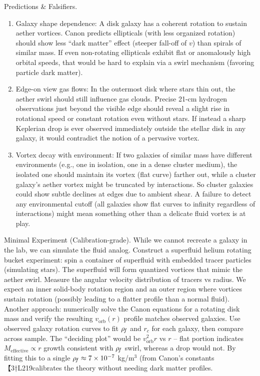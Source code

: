 \documentclass[11pt]{article}
\begin{document}
Predictions & Falsifiers.


\begin{enumerate}

\item 
Galaxy shape dependence: A disk galaxy has a coherent rotation to sustain aether vortices. Canon predicts ellipticals (with less organized rotation) should show less “dark matter” effect (steeper fall-off of $v$) than spirals of similar mass. If even non-rotating ellipticals exhibit flat or anomalously high orbital speeds, that would be hard to explain via a swirl mechanism (favoring particle dark matter).




\item 
Edge-on view gas flows: In the outermost disk where stars thin out, the aether swirl should still influence gas clouds. Precise 21-cm hydrogen observations just beyond the visible edge should reveal a slight rise in rotational speed or constant rotation even without stars. If instead a sharp Keplerian drop is ever observed immediately outside the stellar disk in any galaxy, it would contradict the notion of a pervasive vortex.




\item 
Vortex decay with environment: If two galaxies of similar mass have different environments (e.g., one in isolation, one in a dense cluster medium), the isolated one should maintain its vortex (flat curve) farther out, while a cluster galaxy’s aether vortex might be truncated by interactions. So cluster galaxies could show subtle declines at edges due to ambient shear. A failure to detect any environmental cutoff (all galaxies show flat curves to infinity regardless of interactions) might mean something other than a delicate fluid vortex is at play.




\end{enumerate}

Minimal Experiment (Calibration-grade). While we cannot recreate a galaxy in the lab, we can simulate the fluid analog. Construct a superfluid helium rotating bucket experiment: spin a container of superfluid with embedded tracer particles (simulating stars). The superfluid will form quantized vortices that mimic the aether swirl. Measure the angular velocity distribution of tracers vs radius. We expect an inner solid-body rotation region and an outer region where vortices sustain rotation (possibly leading to a flatter profile than a normal fluid). Another approach: numerically solve the Canon equations for a rotating disk mass and verify the resulting $v_{\text{orb}}(r)$ profile matches observed galaxies. Use observed galaxy rotation curves to fit $\rho_{\!f}$ and $r_c$ for each galaxy, then compare across sample. The “deciding plot” would be $v_{\text{orb}}^2 r$ vs $r$ – flat portion indicates $M_{\text{effective}} \propto r$ growth consistent with $\rho_{\!f}$ swirl, whereas a drop would not. By fitting this to a single $\rho_{\!f} \approx 7\times10^{-7}$ kg/m$^3$ (from Canon’s constants【3†L219calibrates the theory without needing dark matter profiles.
\end{document}
